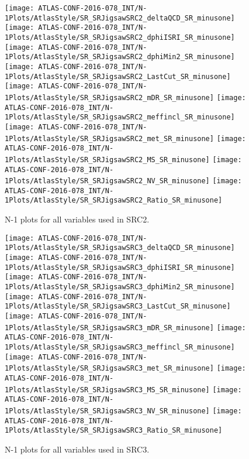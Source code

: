\begin{figure}[tbp]
\begin{center}
\texttt{[image: ATLAS-CONF-2016-078\_INT/N-1Plots/AtlasStyle/SR\_SRJigsawSRC2\_deltaQCD\_SR\_minusone]}
\texttt{[image: ATLAS-CONF-2016-078\_INT/N-1Plots/AtlasStyle/SR\_SRJigsawSRC2\_dphiISRI\_SR\_minusone]}
\texttt{[image: ATLAS-CONF-2016-078\_INT/N-1Plots/AtlasStyle/SR\_SRJigsawSRC2\_dphiMin2\_SR\_minusone]}
\texttt{[image: ATLAS-CONF-2016-078\_INT/N-1Plots/AtlasStyle/SR\_SRJigsawSRC2\_LastCut\_SR\_minusone]}
\texttt{[image: ATLAS-CONF-2016-078\_INT/N-1Plots/AtlasStyle/SR\_SRJigsawSRC2\_mDR\_SR\_minusone]}
\texttt{[image: ATLAS-CONF-2016-078\_INT/N-1Plots/AtlasStyle/SR\_SRJigsawSRC2\_meffincl\_SR\_minusone]}
\texttt{[image: ATLAS-CONF-2016-078\_INT/N-1Plots/AtlasStyle/SR\_SRJigsawSRC2\_met\_SR\_minusone]}
\texttt{[image: ATLAS-CONF-2016-078\_INT/N-1Plots/AtlasStyle/SR\_SRJigsawSRC2\_MS\_SR\_minusone]}
\texttt{[image: ATLAS-CONF-2016-078\_INT/N-1Plots/AtlasStyle/SR\_SRJigsawSRC2\_NV\_SR\_minusone]}
\texttt{[image: ATLAS-CONF-2016-078\_INT/N-1Plots/AtlasStyle/SR\_SRJigsawSRC2\_Ratio\_SR\_minusone]}
\end{center}
\caption{N-1 plots for all variables used in SRC2.}
\label{fig:SR_SRJigsawSRC1_met_SR_minusone}
\end{figure}

\clearpage
\begin{figure}[tbp]
\begin{center}
\texttt{[image: ATLAS-CONF-2016-078\_INT/N-1Plots/AtlasStyle/SR\_SRJigsawSRC3\_deltaQCD\_SR\_minusone]}
\texttt{[image: ATLAS-CONF-2016-078\_INT/N-1Plots/AtlasStyle/SR\_SRJigsawSRC3\_dphiISRI\_SR\_minusone]}
\texttt{[image: ATLAS-CONF-2016-078\_INT/N-1Plots/AtlasStyle/SR\_SRJigsawSRC3\_dphiMin2\_SR\_minusone]}
\texttt{[image: ATLAS-CONF-2016-078\_INT/N-1Plots/AtlasStyle/SR\_SRJigsawSRC3\_LastCut\_SR\_minusone]}
\texttt{[image: ATLAS-CONF-2016-078\_INT/N-1Plots/AtlasStyle/SR\_SRJigsawSRC3\_mDR\_SR\_minusone]}
\texttt{[image: ATLAS-CONF-2016-078\_INT/N-1Plots/AtlasStyle/SR\_SRJigsawSRC3\_meffincl\_SR\_minusone]}
\texttt{[image: ATLAS-CONF-2016-078\_INT/N-1Plots/AtlasStyle/SR\_SRJigsawSRC3\_met\_SR\_minusone]}
\texttt{[image: ATLAS-CONF-2016-078\_INT/N-1Plots/AtlasStyle/SR\_SRJigsawSRC3\_MS\_SR\_minusone]}
\texttt{[image: ATLAS-CONF-2016-078\_INT/N-1Plots/AtlasStyle/SR\_SRJigsawSRC3\_NV\_SR\_minusone]}
\texttt{[image: ATLAS-CONF-2016-078\_INT/N-1Plots/AtlasStyle/SR\_SRJigsawSRC3\_Ratio\_SR\_minusone]}
\end{center}
\caption{N-1 plots for all variables used in SRC3.}
\label{fig:SR_SRJigsawSRC2_NV_SR_minusone}
\end{figure}

